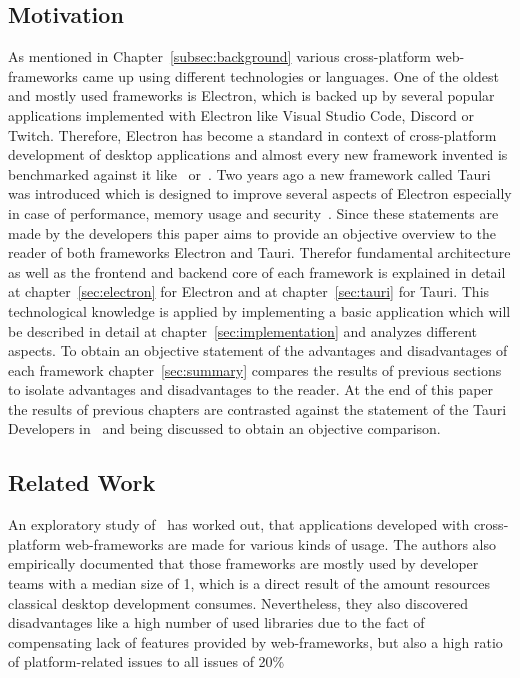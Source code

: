 \subsection{Motivation}\label{subsec:motivation}
As mentioned in Chapter~\ref{subsec:background} various cross-platform web-frameworks came up using different technologies or languages.
One of the oldest and mostly used frameworks is Electron, which is backed up by several popular applications implemented with Electron like Visual Studio Code, Discord or Twitch.
Therefore, Electron has become a standard in context of cross-platform development of desktop applications and almost every new framework invented is benchmarked against it like~\cite{flutter} or~\cite{electron-javafx}.
Two years ago a new framework called Tauri was introduced which is designed to improve several aspects of Electron especially in case of performance, memory usage and security~\cite{tauri}.
Since these statements are made by the developers this paper aims to provide an objective overview to the reader of both frameworks Electron and Tauri.
Therefor fundamental architecture as well as the frontend and backend core of each framework is explained in detail at chapter~\ref{sec:electron} for Electron and at chapter~\ref{sec:tauri} for Tauri.
This technological knowledge is applied by implementing a basic application which will be described in detail at chapter~\ref{sec:implementation} and analyzes different aspects.
To obtain an objective statement of the advantages and disadvantages of each framework chapter~\ref{sec:summary} compares the results of previous sections
to isolate advantages and disadvantages to the reader.
At the end of this paper the results of previous chapters are contrasted against the statement of the Tauri Developers in~\cite{tauri} and being discussed to obtain an objective
comparison.

\subsection{Related Work}\label{subsec:related-work}
An exploratory study of~\cite{explorationstudy} has worked out, that applications developed with cross-platform web-frameworks are made for various kinds of usage.
The authors also empirically documented that those frameworks are mostly used by developer teams with a median size of 1, which is a direct result of the
amount resources classical desktop development consumes.
Nevertheless, they also discovered disadvantages like a high number of used libraries due to the fact of compensating lack of features provided by web-frameworks,
but also a high ratio of platform-related issues to all issues of 20\%

